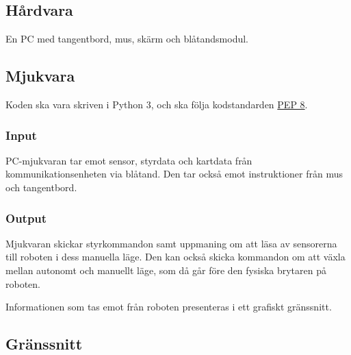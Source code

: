 \documentclass[a4paper,11pt]{article}
\begin{document}
\subsection{Hårdvara}
En PC med tangentbord, mus, skärm och blåtandsmodul.

\subsection{Mjukvara}

Koden ska vara skriven i Python 3, och ska följa kodstandarden \href{https://www.python.org/dev/peps/pep-0008/}{PEP 8}.

\subsubsection{Input}
PC-mjukvaran tar emot sensor, styrdata och kartdata från kommunikationsenheten via blåtand. Den tar också emot instruktioner från mus och tangentbord. 

\subsubsection{Output}
Mjukvaran skickar styrkommandon samt uppmaning om att läsa av sensorerna till roboten i dess manuella läge. Den kan också skicka kommandon om att växla mellan autonomt och manuellt läge, som då går före den fysiska brytaren på roboten.

Informationen som tas emot från roboten presenteras i ett grafiskt gränssnitt.

\subsection{Gränssnitt} \label{ssec:PCInterface}
\end{document}
